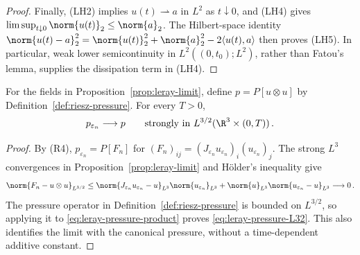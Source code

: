 \documentclass[11pt,reqno]{amsart}
\begin{document}
\begin{proof}
Finally, (LH2) implies $u(t)\rightharpoonup a$ in $L^2$ as $t\downarrow0$,
and (LH4) gives $\limsup_{t\downarrow0}\norm{u(t)}_2\le\norm{a}_2$.
The Hilbert-space identity $\norm{u(t)-a}_2^2=\norm{u(t)}_2^2+
\norm{a}_2^2-2\langle u(t),a\rangle$
then proves (LH5). In particular, weak lower semicontinuity in
$L^2((0,t_0);L^2)$, rather than Fatou's lemma, supplies the dissipation
term in (LH4).
\end{proof}

\begin{proposition}\label{prop:leray-pressure-limit}
For the fields in Proposition~\ref{prop:leray-limit}, define
$p=P[u\otimes u]$ by Definition~\ref{def:riesz-pressure}. For every $T>0$,
\begin{equation}\label{eq:leray-pressure-L32}
 p_{\varepsilon_n}\longrightarrow p
 \qquad\text{strongly in }L^{3/2}(\R^3\times(0,T))\,.
\end{equation}
\end{proposition}

\begin{proof}
By (R4), $p_{\varepsilon_n}=P[F_n]$ for
$(F_n)_{ij}=(J_{\varepsilon_n}u_{\varepsilon_n})_i
(u_{\varepsilon_n})_j$. The strong $L^3$ convergences in
Proposition~\ref{prop:leray-limit} and H\"older's inequality give
\begin{equation}\label{eq:leray-pressure-product}
\norm{F_n-u\otimes u}_{L^{3/2}}
 \le 
\norm{J_{\varepsilon_n}u_{\varepsilon_n}-u}_{L^3}
\norm{u_{\varepsilon_n}}_{L^3}
       +
\norm{u}_{L^3}
\norm{u_{\varepsilon_n}-u}_{L^3}
 \longrightarrow0\,.
\end{equation}
The pressure operator in Definition~\ref{def:riesz-pressure} is bounded on
$L^{3/2}$, so applying it to \eqref{eq:leray-pressure-product} proves
\eqref{eq:leray-pressure-L32}. This also identifies the limit with the
canonical pressure, without a time-dependent additive constant.
\end{proof}
\end{document}
